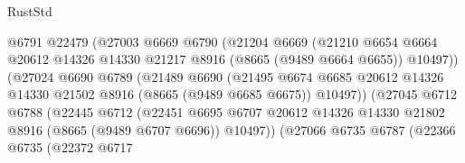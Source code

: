 \begin{lexlean}{RustStd}
\begin{coremodule}
                                  @6791
                                  @22479
                                  (@27003
                                    @6669
                                    @6790
                                    (@21204
                                      @6669
                                      (@21210
                                        @6654
                                        @6664
                                        @20612
                                        @14326
                                        @14330
                                        @21217
                                        @8916
                                        (@8665 (@9489 @6664 @6655))
                                        @10497))
                                    (@27024
                                      @6690
                                      @6789
                                      (@21489
                                        @6690
                                        (@21495
                                          @6674
                                          @6685
                                          @20612
                                          @14326
                                          @14330
                                          @21502
                                          @8916
                                          (@8665 (@9489 @6685 @6675))
                                          @10497))
                                      (@27045
                                        @6712
                                        @6788
                                        (@22445
                                          @6712
                                          (@22451
                                            @6695
                                            @6707
                                            @20612
                                            @14326
                                            @14330
                                            @21802
                                            @8916
                                            (@8665 (@9489 @6707 @6696))
                                            @10497))
                                        (@27066
                                          @6735
                                          @6787
                                          (@22366
                                            @6735
                                            (@22372
                                              @6717

\end{coremodule}
\end{lexlean}
